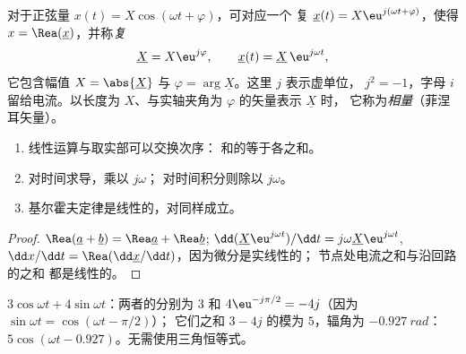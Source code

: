 \begin{definition}[复振幅]\label{def:b1:sinusoidal-impedance:complex}
对于正弦量 $x(t) = X\cos(\omega t + \varphi)$，可对应一个
复 $\underline{x}(t) = X\eu^{j(\omega t + \varphi)}$，使得
$x = \Rea(\underline{x})$，并称\emph{复}
\[
\underline{X} = X\eu^{j\varphi}, \qquad \underline{x}(t) = \underline{X}\,\eu^{j\omega t},
\]
它包含幅值 $X = \abs{\underline{X}}$ 与
$\varphi = \arg\underline{X}$。这里 $j$ 表示虚单位，
$j^2 = -1$，字母 $i$ 留给电流。以长度为
$X$、与实轴夹角为 $\varphi$ 的矢量表示 $\underline{X}$ 时，
它称为\emph{相量}（菲涅耳矢量）。
\end{definition}

\begin{proposition}[复数方法的运算法则]\label{prop:b1:sinusoidal-impedance:rules}
\begin{enumerate}
  \item 线性运算与取实部可以交换次序：
        和的等于各之和。
  \item 对时间求导，乘以 $j\omega$；
        对时间积分则除以 $j\omega$。
  \item 基尔霍夫定律是线性的，对同样成立。
\end{enumerate}
\end{proposition}

\begin{proof}
$\Rea(\underline a + \underline b) = \Rea\underline a + \Rea\underline b$;
$\dd(\underline X\eu^{j\omega t})/\dd t = j\omega\underline X\eu^{j\omega t}$,
$\dd x/\dd t = \Rea(\dd\underline x/\dd t)$，因为微分是实线性的；
节点处电流之和与沿回路的之和
都是线性的。
\end{proof}

\begin{example}[两个正弦量相加]\label{ex:b1:sinusoidal-impedance:add}
$3\cos\omega t + 4\sin\omega t$：两者的分别为 $3$ 和
$4\eu^{-j\pi/2} = -4j$（因为 $\sin\omega t = \cos(\omega t - \pi/2)$）；
它们之和 $3 - 4j$ 的模为 $5$，辐角为 $-0.927\ \unit{rad}$：
$5\cos(\omega t - 0.927)$。无需使用三角恒等式。
\end{example}

